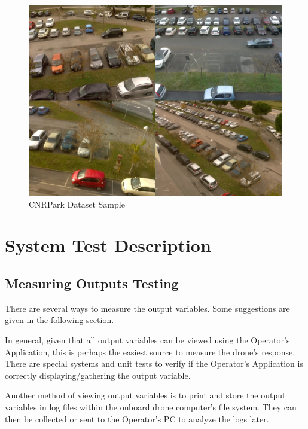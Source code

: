 \documentclass[12pt, titlepage]{article}
\begin{document}
\begin{figure}[h!]
  \begin{center} 
  \caption{CNRPark Dataset Sample}
  \label{CNRParkSample}
        \includegraphics[width=1\textwidth]{VnVPlan/CNRParkDataset.png}
  \end{center}
\end{figure}

\clearpage

\section{System Test Description}
\label{systemTest}

\subsection{Measuring Outputs Testing}

There are several ways to measure the output variables. Some suggestions are given in the following section. 

In general, given that all output variables can be viewed using the Operator's Application, this is perhaps the easiest source to measure the drone's response. There are special systems and unit tests to verify if the Operator's Application is correctly displaying/gathering the output variable.

Another method of viewing output variables is to print and store the output variables in log files within the onboard drone computer's file system. They can then be collected or sent to the Operator's PC to analyze the logs later.
\end{document}
